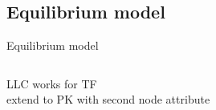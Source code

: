 \subsection{Equilibrium model}
\begin{frame}{Equilibrium model}
\label{sec:equilibrium_model}

\begin{columns}
\begin{column}{0.5\textwidth}

LLC works for TF\\
extend to PK with second node attribute






\end{column}
\end{columns}
\end{frame}

